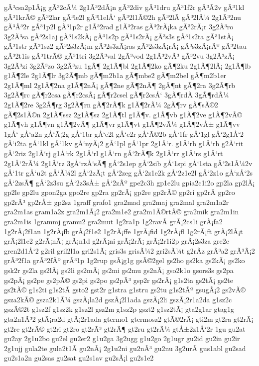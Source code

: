 {gÃ³csa2p1Ã¡g
gÃ³2cÃ¼
2g1Ã³2dÃ¡n
gÃ³2div
gÃ³1dru
gÃ³1f2r
gÃ³Ã­2v
gÃ³1kl
gÃ³1krÃ©
gÃ³2lar
gÃ³le2l
gÃ³l1elÅ‘
gÃ³2l1Ã©2h
gÃ³2lÃ­
gÃ³2lÃ¼
2g1Ã³2nu
gÃ³Ã³2r
gÃ³1p2l
gÃ³1p2r
g1Ã³2rad
g1Ã³2ras
gÃ³2rÃ¡ka
gÃ³2rÃ¡r
3g2Ã³ro
3g2Ã³sa
gÃ³2s1aj
gÃ³1s2kÃ¡
gÃ³1s2p
gÃ³1s2rÃ¡
gÃ³s3s
gÃ³1s2ta
gÃ³1stÃ¡
gÃ³1str
gÃ³1sz2
gÃ³2s3zÃ¡m
gÃ³2s3zÃ¡ras
gÃ³2s3zÃ¡rÃ¡
gÃ³s3zÃ¡rÃº
gÃ³2tau
gÃ³2t1is
gÃ³1trÃ©
gÃ³1tri
3g2Ã³val
2gÃ³vod
2g1Ã³2vÃ³
gÃ³2vu
3g2Ã³zÃ¡
3g2Ã³zi
3g2Ã³zo
3g2Ã³zu
1gÃ¶
2g1Ã¶bl
2g1Ã¶2ko
gÃ¶2ku
2g1Ã¶2lÃ¡
2g1Ã¶lb
g1Ã¶2le
2g1Ã¶lr
3g2Ã¶mb
gÃ¶m2b1a
gÃ¶mbe2
gÃ¶m2bel
gÃ¶m2b1er
2g1Ã¶ml
2g1Ã¶2na
g1Ã¶2nÃ¡
gÃ¶2ne
gÃ¶2nÃ¶
2gÃ¶nt
gÃ¶2ra
3g2Ã¶rb
3g2Ã¶rc
gÃ¶r2csa
gÃ¶r2csÃ¡
gÃ¶r2csel
gÃ¶r2csÅ‘
3gÃ¶rdÃ­
3gÃ¶rdÃ¼
2g1Ã¶2re
3g2Ã¶rg
3g2Ã¶rn
gÃ¶2rÃ¶k
g1Ã¶2rÃ¼
2gÃ¶rv
gÃ¶sÃ©2
gÃ¶2s1Ã©n
2g1Ã¶ssz
2g1Ã¶sz
2g1Ã¶tl
g1Ã¶v.
g1Ã¶vb
g1Ã¶2ve
g1Ã¶2vÃ©
g1Ã¶vh
g1Ã¶vn
g1Ã¶2vÃ¶
g1Ã¶vr
g1Ã¶vt
g1Ã¶2vÃ¼
g1Ã¶2vÅ±
g1Ã¶vv
1gÅ‘
gÅ‘a2n
gÅ‘Ã¡2g
gÅ‘1br
gÅ‘e2l
gÅ‘e2r
gÅ‘Ã©2b
gÅ‘1fr
gÅ‘1gl
gÅ‘2g1Å‘2
gÅ‘i2ta
gÅ‘1kl
gÅ‘1kv
gÅ‘nyÃ¡2
gÅ‘1pl
gÅ‘1pr
2g1Å‘r.
g1Å‘rb
g1Å‘rh
g2Å‘rit
gÅ‘2riz
2g1Å‘rj
g1Å‘rk
2g1Å‘rl
g1Å‘rn
gÅ‘2rÃ¶k
2g1Å‘rr
g1Å‘rs
g1Å‘rt
2g1Å‘2rÃ¼
2g1Å‘rz
3gÅ‘rzÅ‘sÃ¶
gÅ‘2s1ep
gÅ‘2sib
gÅ‘1spi
gÅ‘1sta
gÅ‘2s1Ã¼2v
gÅ‘1tr
gÅ‘u2t
gÅ‘Ã¼2l
gÅ‘2zÃ¡t
gÅ‘2zeg
gÅ‘2z1e2k
gÅ‘2z1e2l
gÅ‘2z1o
gÅ‘zÅ‘2s
gÅ‘2zsÃ¶
gÅ‘2z3su
gÅ‘2z3sÅ±
gÅ‘2zÃº
gpe2c3h
gp1e2lu
gpia2c1i2o
gp2la
gp2lÃ¡
gp2le
gp2lu
gpon2ga
gpo2re
gp2ra
gp2rÃ¡
gp2re
gp2rÃ©
gp2ri
gp2rÃ­
gp2ro
gp2rÃ³
gp2rÅ±
gp2sz
1graff
grafo1
gra2mad
gra2maj
gra2mal
gra2m1a2r
gra2m1as
gram1a2z
gra2m1Ã¡2
gra2m1e2
gra2m1Ã©rtÃ©
gra2mik
gra2m1in
gra2m1is
1grammj
gramu2
gra2mut
1g2ra1p
1g2ravÃ­
grÃ¡2cs1i
grÃ¡fa2
1g2rÃ¡2f1an
1g2rÃ¡fb
grÃ¡2f1e2
1g2rÃ¡ffe
1grÃ¡fid
1g2rÃ¡fl
1g2rÃ¡ft
grÃ¡2lÃ¡t
grÃ¡2l1e2
g2rÃ¡nÃ¡
grÃ¡n1d
g2rÃ¡ni
grÃ¡2rÃ¡
grÃ¡2r1i2p
grÃ¡2s3za
gre2e
gren2d1Å‘2
g2ril
gril2l1a
gri2s1Ã¡
gris3s
grisÃ¼2
gri2sÃ¼t
g2rÃ­z
grÃ³a2
grÃ³Ã¡2
grÃ³2f1a
grÃ³2fÃº
grÃ³1p
1g2rup
gsÃ¡g1g
gsÃ©2gel
gs2ho
gs2ka
gs2kÃ¡
gs2ko
gsk2r
gs2la
gs2lÃ¡
gs2li
gs2mÃ¡
gs2mi
gs2mu
gs2nÃ¡
gso2k1o
gsors3s
gs2pa
gs2pÃ¡
gs2pe
gs2pÃ©
gs2pi
gs2po
gs2pÃ³
gsp2r
gs2rÃ¡
g1s2ta
gs2tÃ¡
gs2te
gs2tÃ©
g1s2ti
g1s2tÃ­
gsto2
gst2r
g1stra
g1stru
gs2tu
g1s2tÃº
gsugÃ¡2
gs2vÃ©
gsza2kÃ©
gsza2k1Ã¼
gszÃ¡la2d
gszÃ¡2l1ada
gszÃ¡2li
gszÃ¡2r1a2da
g1sz2c
gszÃ©2t
g1sz2f
g1sz2k
g1sz2l
gsz2m
g1sz2p
gszt2
g1sz2tÃ¡
gta2g1ar
gtag1g
gta2n1Ã³2
gtÃ¡ra2d
gtÃ¡2r1ada
gtermo1
gtermosz2
gtÃ©2rÃ¡
gti2m
gt2ra
gt2rÃ¡
gt2re
gt2rÃ©
gt2ri
gt2ro
gt2rÃ³
gt2rÃ¶
gt2ru
gt2rÃ¼
gtÅ±2z1Å‘2r
1gu
gu2at
gu2ay
2g1u2bo
gu2el
gu2er2
g1u2ga
3g2ugg
g1u2go
2g1ugr
gu2id
gu2in
gu2ir
2g1ujj
gula2te
gula2t1Ã­
gu2nÃ¡
2g1u2ni
gu2nÃ³
gu2nu
3g2urÃ­
gus1abl
gu2sad
gu2s1a2n
gu2sas
gu2sat
gu2s1av
gu2sÃ¡l
gu2s1e2
}
